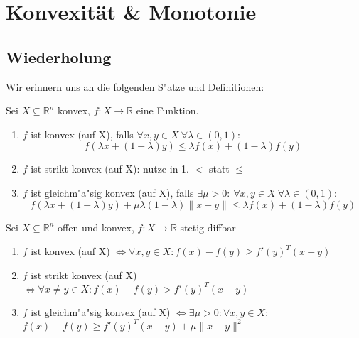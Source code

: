\chapter{Konvexität \& Monotonie}


\section{Wiederholung}
	Wir erinnern uns an die folgenden S"atze und Definitionen:
	\begin{definition}[Konvexität]
		Sei $X\subseteq\mathbb{R}^n$ konvex, $f : X\to\mathbb{R}$ eine Funktion.
		\begin{enumerate}
			\item $f$ ist konvex (auf X), falls $\forall{}x,y\in{}X \ \forall{} \lambda{}\in{}(0,1):$ \\
			\begin{displaymath}
			f(\lambda{}x+(1-\lambda)y)\leq\lambda{}f(x)+(1-\lambda)f(y)
			\end{displaymath}
			\item $f$ ist strikt konvex (auf X): nutze in 1. \(<\) statt $\leq$
			\item $f$ ist gleichm"a"sig konvex (auf X), falls $\exists{}\mu{}>0: \ \forall{}x,y\in{}X  \ \forall{}\lambda{}\in(0,1):$ \\
			\begin{equation*}
			f(\lambda{}x+(1-\lambda{})y)+\mu{}\lambda{}(1-\lambda{})\|x-y\|\leq\lambda{}f(x)+(1-\lambda{})f(y)
			\end{equation*}
		\end{enumerate}
	\end{definition}
	
	\begin{satz}
		Sei $X\subseteq\mathbb{R}^n$ offen und konvex, $f : X\to\mathbb{R}$ stetig diffbar
		\begin{enumerate}
			\item $f$ ist konvex (auf X) $ \Leftrightarrow \forall x,y \in X: 		f(x)-f(y)\geq{}f'(y)^T(x-y)$
			\item $f$ ist strikt konvex (auf X) $ \Leftrightarrow\forall x \neq y \in X : f(x)-f(y) > f'(y)^T(x-y)$
			\item $f$ ist gleichm"a"sig konvex (auf X) $\Leftrightarrow \exists \mu > 0 : \forall x,y \in X:
			$\\$ f(x)-f(y) \geq f'(y)^T(x-y)+ \mu \| x-y \|^2 $
		\end{enumerate}
	\end{satz}
	
